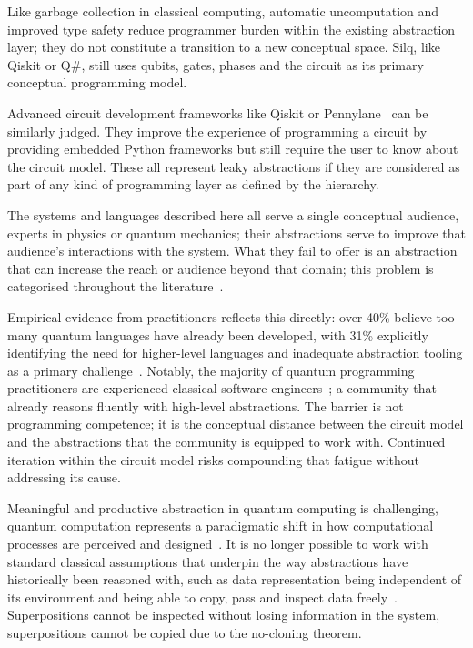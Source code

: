 Like garbage collection in classical computing, automatic uncomputation and improved type safety reduce programmer burden within the existing abstraction layer; they do not constitute a transition to a new conceptual space.
Silq, like Qiskit or Q\#, still uses qubits, gates, phases and the circuit as its primary conceptual programming model.

Advanced circuit development frameworks like Qiskit or Pennylane~\cite{bergholm2018pennylane} can be similarly judged.
They improve the experience of programming a circuit by providing embedded Python frameworks but still require the user to know about the circuit model.
These all represent leaky abstractions if they are considered as part of any kind of programming layer as defined by the hierarchy.

The systems and languages described here all serve a single conceptual audience, experts in physics or quantum mechanics; their abstractions serve to improve that audience's interactions with the system.
What they fail to offer is an abstraction that can increase the reach or audience beyond that domain; this problem is categorised throughout the literature~\cite{cobb2022higherlevelabstractions, ferreira2024qplusage}.

Empirical evidence from practitioners reflects this directly: over 40\% believe too many quantum languages have already been developed, with 31\% explicitly identifying the need for higher-level languages and inadequate abstraction tooling as a primary challenge~\cite{ferreira2024qplusage}.
Notably, the majority of quantum programming practitioners are experienced classical software engineers~\cite{ferreira2024qplusage}; a community that already reasons fluently with high-level abstractions.
The barrier is not programming competence; it is the conceptual distance between the circuit model and the abstractions that the community is equipped to work with.
Continued iteration within the circuit model risks compounding that fatigue without addressing its cause.

Meaningful and productive abstraction in quantum computing is challenging, quantum computation represents a paradigmatic shift in how computational processes are perceived and designed~\cite{furntratt2024higherabstractionlevels}.
It is no longer possible to work with standard classical assumptions that underpin the way abstractions have historically been reasoned with, such as data representation being independent of its environment and being able to copy, pass and inspect data freely~\cite{LiskovGuttag1986, yuan2025foundationalabstractions}.
Superpositions cannot be inspected without losing information in the system, superpositions cannot be copied due to the no-cloning theorem.


